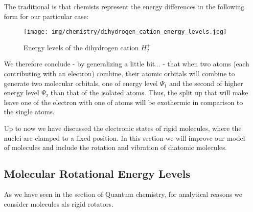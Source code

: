	The traditional is that chemists represent the energy differences in the following form for our particular case:
	\begin{figure}[H]
		\begin{center}
		\texttt{[image: img/chemistry/dihydrogen\_cation\_energy\_levels.jpg]}
		\end{center}	
		\caption{Energy levels of the dihydrogen cation $H_2^+$}
	\end{figure}
	We therefore conclude - by generalizing a little bit... - that when two atoms (each contributing with an electron) combine, their atomic orbitals will combine to generate two molecular orbitals, one of energy level $\Psi_1$ and the second of higher energy level $\Psi_2$ than that of the isolated atoms. Thus, the split up that will make leave one of the electron with one of atoms will be exothermic in comparison to the single atoms.
	
	Up to now we have discussed the electronic states of rigid molecules, where the nuclei are clamped to a fixed position. In this section we will improve our model of molecules and include the rotation and vibration of diatomic molecules.

	\pagebreak
	\subsection{Molecular Rotational Energy Levels}
	As we have seen in the section of Quantum chemistry, for analytical reasons we consider molecules als rigid rotators.

